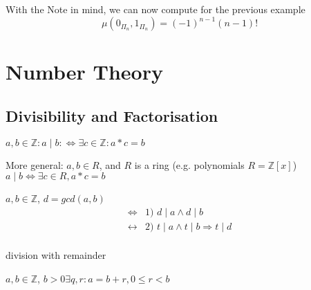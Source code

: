 With the Note in mind, we can now compute for the previous example
\[
    \mu( 0_{\Pi_n}, 1_{\Pi_n}) = (-1)^{n-1} (n-1)!
\]


\chapter{Number Theory}

\section{Divisibility and Factorisation}

\begin{definition}
$a,b \in \mathbb{Z}: a\mid b: \Leftrightarrow \exists c \in \mathbb{Z}: a * c = b$

More general: 
$a,b \in R$, and $R$ is a ring (e.g. polynomials $R = \mathbb{Z}[x]$)
    $a \mid b \Leftrightarrow \exists c \in R , a * c = b$
\end{definition}

\begin{definition}
$a,b \in \mathbb{Z}$, $d = gcd(a,b)$
\begin{align*}
    \Leftrightarrow & \text{1) } d \mid a \wedge d \mid b \\
    \leftrightarrow & \text{2) } t \mid a \wedge t \mid b \Rightarrow t \mid d \\
\end{align*}
\end{definition}

\begin{definition}
division with remainder

$a,b \in \mathbb{Z}$, $b > 0  \exists q,r: a = b  + r, 0 \leq r < b$
\end{definition}



